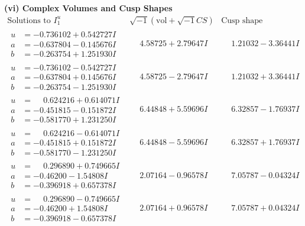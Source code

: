 \documentclass[1p]{elsarticle_modified}
\theoremstyle{definition}
\newcommand{\I}{\sqrt{-1}}
\begin{document}
\newpage\flushleft \textbf{(vi) Complex Volumes and Cusp Shapes}
$$\begin{array}{c|c|c}  
\text{Solutions to }I^u_{1}& \I (\text{vol} + \sqrt{-1}CS) & \text{Cusp shape}\\
 \hline 
\begin{aligned}
u &= -0.736102 + 0.542727 I \\
a &= -0.637804 - 0.145676 I \\
b &= -0.263754 + 1.251930 I\end{aligned}
 & \phantom{-}4.58725 + 2.79647 I & \phantom{-}1.21032 - 3.36441 I \\ \hline\begin{aligned}
u &= -0.736102 - 0.542727 I \\
a &= -0.637804 + 0.145676 I \\
b &= -0.263754 - 1.251930 I\end{aligned}
 & \phantom{-}4.58725 - 2.79647 I & \phantom{-}1.21032 + 3.36441 I \\ \hline\begin{aligned}
u &= \phantom{-}0.624216 + 0.614071 I \\
a &= -0.451815 - 0.151872 I \\
b &= -0.581770 + 1.231250 I\end{aligned}
 & \phantom{-}6.44848 + 5.59696 I & \phantom{-}6.32857 - 1.76937 I \\ \hline\begin{aligned}
u &= \phantom{-}0.624216 - 0.614071 I \\
a &= -0.451815 + 0.151872 I \\
b &= -0.581770 - 1.231250 I\end{aligned}
 & \phantom{-}6.44848 - 5.59696 I & \phantom{-}6.32857 + 1.76937 I \\ \hline\begin{aligned}
u &= \phantom{-}0.296890 + 0.749665 I \\
a &= -0.46200 - 1.54808 I \\
b &= -0.396918 + 0.657378 I\end{aligned}
 & \phantom{-}2.07164 - 0.96578 I & \phantom{-}7.05787 - 0.04324 I \\ \hline\begin{aligned}
u &= \phantom{-}0.296890 - 0.749665 I \\
a &= -0.46200 + 1.54808 I \\
b &= -0.396918 - 0.657378 I\end{aligned}
 & \phantom{-}2.07164 + 0.96578 I & \phantom{-}7.05787 + 0.04324 I \\ \hline\begin{aligned}

\end{aligned}
\end{array}$$
\end{document}
